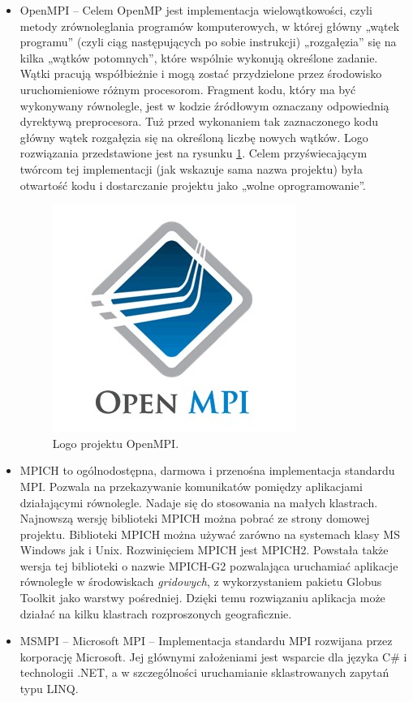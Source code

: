 \documentclass[10pt,a4paper,titlepage,twoside]{report}
\begin{document}
\begin{itemize}
	\item OpenMPI – Celem OpenMP jest implementacja wielowątkowości, czyli metody zrównoleglania programów komputerowych, w której główny „wątek programu” (czyli ciąg następujących po sobie instrukcji) „rozgałęzia” się na kilka „wątków potomnych”, które wspólnie wykonują określone zadanie. Wątki pracują współbieżnie i mogą zostać przydzielone przez środowisko uruchomieniowe różnym procesorom. Fragment kodu, który ma być wykonywany równolegle, jest w kodzie źródłowym oznaczany odpowiednią dyrektywą preprocesora. Tuż przed wykonaniem tak zaznaczonego kodu główny wątek rozgałęzia się na określoną liczbę nowych wątków. Logo rozwiązania przedstawione jest na rysunku \ref{mpi_logo}. Celem przyświecającym twórcom tej implementacji (jak wskazuje sama nazwa projektu) była otwartość kodu i dostarczanie projektu jako „wolne oprogramowanie”.
	\begin{figure}[ht!]
		\centering
		\includegraphics[scale=0.7]{pics/mpi.jpg}
		\caption{Logo projektu OpenMPI.}
		\label{mpi_logo}
	\end{figure}
	\item MPICH to ogólnodostępna, darmowa i przenośna implementacja standardu MPI. Pozwala na przekazywanie komunikatów pomiędzy aplikacjami działającymi równolegle. Nadaje się do stosowania na małych klastrach. Najnowszą wersję biblioteki MPICH można pobrać ze strony domowej projektu. Biblioteki MPICH można używać zarówno na systemach klasy MS Windows jak i Unix. Rozwinięciem MPICH jest MPICH2. Powstała także wersja tej biblioteki o nazwie MPICH-G2 pozwalająca uruchamiać aplikacje równoległe w środowiskach \textit{gridowych}, z wykorzystaniem pakietu Globus Toolkit jako warstwy pośredniej. Dzięki temu rozwiązaniu aplikacja może działać na kilku klastrach rozproszonych geograficznie.
	\item MSMPI – Microsoft MPI – Implementacja standardu MPI rozwijana przez korporację Microsoft. Jej głównymi założeniami jest wsparcie dla języka C\# i technologii .NET, a w szczególności uruchamianie sklastrowanych zapytań typu LINQ.
\end{itemize}
\end{document}
